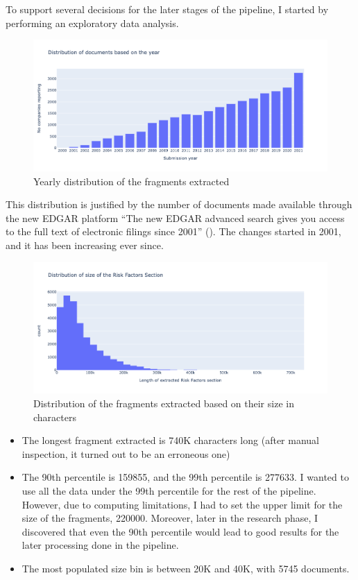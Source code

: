 \documentclass[12pt,MSc,a4paper,oneside]{muthesis}
\begin{document}
To support several decisions for the later stages of the pipeline, I started by performing an exploratory data analysis.
\begin{figure}[h]
    \centering
    \includegraphics[scale=0.4]{dataset_analysis/Yearly Distribution document.png}
    \caption{Yearly distribution of the fragments extracted}
\end{figure}

This distribution is justified by the number of documents made available through the new EDGAR platform “The new EDGAR advanced search gives you access to the full text of electronic filings since 2001” (\cite{edgar-search}). The changes started in 2001, and it has been increasing ever since.

\newpage

\begin{figure}[h]
    \centering
    \includegraphics[scale=0.5]{dataset_analysis/Distribution of size.png}
    \caption{Distribution of the fragments extracted based on their size in characters}
\end{figure}

\begin{itemize}
          \item The longest fragment extracted is 740K characters long (after manual inspection, it turned out to be an erroneous one)
          \item The 90th percentile is 159855, and the 99th percentile is 277633. I wanted to use all the data under the 99th percentile for the rest of the pipeline. However, due to computing limitations, I had to set the upper limit for the size of the fragments, 220000. Moreover, later in the research phase, I discovered that even the 90th percentile would lead to good results for the later processing done in the pipeline.
          \item  The most populated size bin is between 20K and 40K, with 5745 documents.
\end{itemize}
\end{document}
